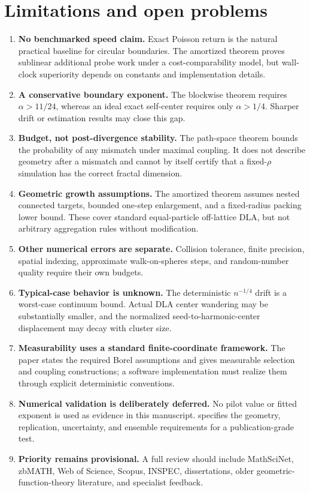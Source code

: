 \documentclass[11pt]{article}
\theoremstyle{mainthm}
\theoremstyle{definition}
\theoremstyle{remark}
\begin{document}
\section{Limitations and open problems}

\begin{enumerate}
  \item \textbf{No benchmarked speed claim.} Exact Poisson return is the natural practical baseline for circular boundaries. The amortized theorem proves sublinear additional probe work under a cost-comparability model, but wall-clock superiority depends on constants and implementation details.
  \item \textbf{A conservative boundary exponent.} The blockwise theorem requires $\alpha>11/24$, whereas an ideal exact self-center requires only $\alpha>1/4$. Sharper drift or estimation results may close this gap.
  \item \textbf{Budget, not post-divergence stability.} The path-space theorem bounds the probability of any mismatch under maximal coupling. It does not describe geometry after a mismatch and cannot by itself certify that a fixed-$\rho$ simulation has the correct fractal dimension.
  \item \textbf{Geometric growth assumptions.} The amortized theorem assumes nested connected targets, bounded one-step enlargement, and a fixed-radius packing lower bound. These cover standard equal-particle off-lattice DLA, but not arbitrary aggregation rules without modification.
  \item \textbf{Other numerical errors are separate.} Collision tolerance, finite precision, spatial indexing, approximate walk-on-spheres steps, and random-number quality require their own budgets.
  \item \textbf{Typical-case behavior is unknown.} The deterministic $n^{-1/4}$ drift is a worst-case continuum bound. Actual DLA center wandering may be substantially smaller, and the normalized seed-to-harmonic-center displacement may decay with cluster size.
  \item \textbf{Measurability uses a standard finite-coordinate framework.} The paper states the required Borel assumptions and gives measurable selection and coupling constructions; a software implementation must realize them through explicit deterministic conventions.
  \item \textbf{Numerical validation is deliberately deferred.} No pilot value or fitted exponent is used as evidence in this manuscript.  specifies the geometry, replication, uncertainty, and ensemble requirements for a publication-grade test.
  \item \textbf{Priority remains provisional.} A full review should include MathSciNet, zbMATH, Web of Science, Scopus, INSPEC, dissertations, older geometric-function-theory literature, and specialist feedback.
\end{enumerate}
\end{document}
